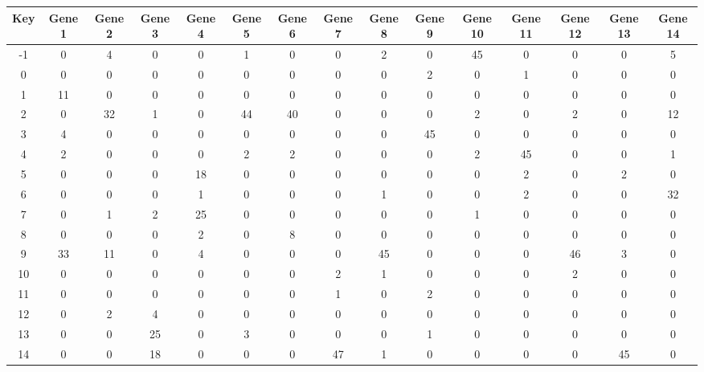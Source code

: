 \begin{tabular}{|c|c|c|c|c|c|c|c|c|c|c|c|c|c|c|}
\hline
Key & Gene 1 & Gene 2 & Gene 3 & Gene 4 & Gene 5 & Gene 6 & Gene 7 & Gene 8 & Gene 9 & Gene 10 & Gene 11 & Gene 12 & Gene 13 & Gene 14 \\
\hline
-1 & 0 & 4 & 0 & 0 & 1 & 0 & 0 & 2 & 0 & 45 & 0 & 0 & 0 & 5 \\
0 & 0 & 0 & 0 & 0 & 0 & 0 & 0 & 0 & 2 & 0 & 1 & 0 & 0 & 0 \\
1 & 11 & 0 & 0 & 0 & 0 & 0 & 0 & 0 & 0 & 0 & 0 & 0 & 0 & 0 \\
2 & 0 & 32 & 1 & 0 & 44 & 40 & 0 & 0 & 0 & 2 & 0 & 2 & 0 & 12 \\
3 & 4 & 0 & 0 & 0 & 0 & 0 & 0 & 0 & 45 & 0 & 0 & 0 & 0 & 0 \\
4 & 2 & 0 & 0 & 0 & 2 & 2 & 0 & 0 & 0 & 2 & 45 & 0 & 0 & 1 \\
5 & 0 & 0 & 0 & 18 & 0 & 0 & 0 & 0 & 0 & 0 & 2 & 0 & 2 & 0 \\
6 & 0 & 0 & 0 & 1 & 0 & 0 & 0 & 1 & 0 & 0 & 2 & 0 & 0 & 32 \\
7 & 0 & 1 & 2 & 25 & 0 & 0 & 0 & 0 & 0 & 1 & 0 & 0 & 0 & 0 \\
8 & 0 & 0 & 0 & 2 & 0 & 8 & 0 & 0 & 0 & 0 & 0 & 0 & 0 & 0 \\
9 & 33 & 11 & 0 & 4 & 0 & 0 & 0 & 45 & 0 & 0 & 0 & 46 & 3 & 0 \\
10 & 0 & 0 & 0 & 0 & 0 & 0 & 2 & 1 & 0 & 0 & 0 & 2 & 0 & 0 \\
11 & 0 & 0 & 0 & 0 & 0 & 0 & 1 & 0 & 2 & 0 & 0 & 0 & 0 & 0 \\
12 & 0 & 2 & 4 & 0 & 0 & 0 & 0 & 0 & 0 & 0 & 0 & 0 & 0 & 0 \\
13 & 0 & 0 & 25 & 0 & 3 & 0 & 0 & 0 & 1 & 0 & 0 & 0 & 0 & 0 \\
14 & 0 & 0 & 18 & 0 & 0 & 0 & 47 & 1 & 0 & 0 & 0 & 0 & 45 & 0 \\
\hline
\end{tabular}